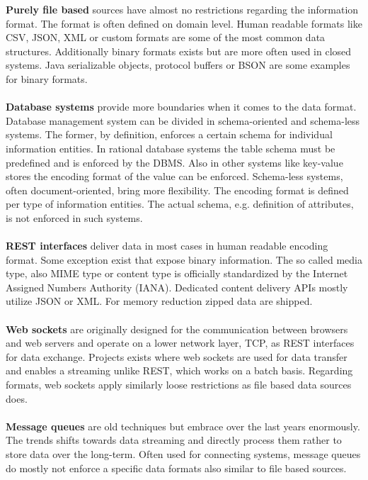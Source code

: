 \noindent\textbf{Purely file based} sources have almost no restrictions regarding the information format. The format is often defined on domain level. Human readable formats like CSV, JSON, XML or custom formats are some of the most common data structures. Additionally binary formats exists but are more often used in closed systems. Java serializable objects\cite{serializable_objects_2017}, protocol buffers\cite{protocol_buffers_2017} or BSON\cite{bson_2017} are some examples for binary formats.
\\\\
\textbf{Database systems} provide more boundaries when it comes to the data format. Database management system can be divided in schema-oriented and schema-less systems. The former, by definition, enforces a certain schema for individual information entities. In rational database systems the table schema must be predefined and is enforced by the DBMS. Also in other systems like key-value stores the encoding format of the value can be enforced. Schema-less systems, often document-oriented, bring more flexibility. The encoding format is defined per type of information entities. The actual schema, e.g. definition of attributes, is not enforced in such systems.
\\\\
\textbf{REST interfaces} deliver data in most cases in human readable encoding format\cite{rest_2017}. Some exception exist that expose binary information. The so called media type, also MIME type or content type is officially standardized by the Internet Assigned Numbers Authority (IANA)\cite{media_types_2017}. Dedicated content delivery APIs mostly utilize JSON or XML. For memory reduction zipped data are shipped. 
\\\\
\textbf{Web sockets} are originally designed for the communication between browsers and web servers and operate on a lower network layer, TCP, as REST interfaces for data exchange\cite{websocket_2017}. Projects exists where web sockets are used for data transfer and enables a streaming unlike REST, which works on a batch basis. Regarding formats, web sockets apply similarly loose restrictions as file based data sources does.
\\\\
\textbf{Message queues} are old techniques but embrace over the last years enormously. The trends shifts towards data streaming and directly process them rather to store data over the long-term. Often used for connecting systems, message queues do mostly not enforce a specific data formats also similar to file based sources.

